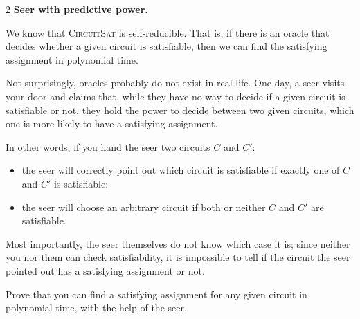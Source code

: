 \documentclass[12pt]{article}
\begin{document}
\begin{problem}{2}
\textbf{Seer with predictive power.}

    We know that \textsc{CircuitSat} is self-reducible. That is, if there is an oracle that decides whether a given circuit is satisfiable, then we can find the satisfying assignment in polynomial time.
    
    Not surprisingly, oracles probably do not exist in real life. One day, a seer visits your door and claims that, while they have no way to decide if a given circuit is satisfiable or not, they hold the power to decide between two given circuits, which one is more likely to have a satisfying assignment.
    
    In other words, if you hand the seer two circuits \(C\) and \(C'\):
    \begin{itemize}
        \item the seer will correctly point out which circuit is satisfiable if exactly one of \(C\) and \(C'\) is satisfiable;
        \item the seer will choose an arbitrary circuit if both or neither \(C\) and \(C'\) are satisfiable.
    \end{itemize}
    
    Most importantly, the seer themselves do not know which case it is; since neither you nor them can check satisfiability, it is impossible to tell if the circuit the seer pointed out has a satisfying assignment or not.
    
    Prove that you can find a satisfying assignment for any given circuit in polynomial time, with the help of the seer.
\end{problem}
\end{document}
